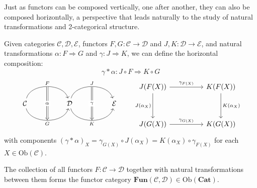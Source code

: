 Just as functors can be composed vertically, one after another, they can also be 
composed horizontally, a perspective that leads naturally to the study of natural 
transformations and 2-categorical structure.
\begin{proposition}
  Given categories $\mathcal{C}, \mathcal{D}, \mathcal{E}$, functors $F, G : \mathcal{C} \to \mathcal{D}$ and $J, K : \mathcal{D} \to \mathcal{E}$, and natural transformations $\alpha: F \Rightarrow G$ and $\gamma: J \Rightarrow K$, we can define the horizontal composition:
\[
\gamma \ast \alpha : J \circ F \Rightarrow K \circ G
\]
\[
\begin{tikzcd}[row sep=huge, column sep=huge]
\mathcal{C}
\arrow[r, bend left=75, "F"{name=U}]
\arrow[r, bend right=75, "G"'{name=D}]
& \mathcal{D}
\arrow[r, bend left=75, "J"{name=W}]
\arrow[r, bend right=75, "K"'{name=X}]
& \mathcal{E}
\arrow[Rightarrow, from=U, to=D, "\alpha" description]
\arrow[Rightarrow, from=W, to=X, "\gamma" description]
\end{tikzcd}
\qquad
\begin{tikzcd}[row sep=huge, column sep=huge]
J(F(X)) \arrow[r, "\gamma_{F(X)}"] \arrow[d, "J(\alpha_X)"'] & K(F(X)) \arrow[d, "K(\alpha_X)"] \\
J(G(X)) \arrow[r, "\gamma_{G(X)}"] & K(G(X))
\end{tikzcd}
\]
with components
\(
(\gamma \ast \alpha)_X = \gamma_{G(X)} \circ J(\alpha_X) = K(\alpha_X) \circ \gamma_{F(X)}
\) for each $X \in \mathrm{Ob}(\mathcal{C})$.
\end{proposition}

\begin{remark}
The collection of all functors $F : \mathcal{C} \to \mathcal{D}$ together with natural transformations between them forms the functor category $\mathbf{Fun}(\mathcal{C}, \mathcal{D}) \in \mathrm{Ob}(\mathbf{Cat})$.
\end{remark}

